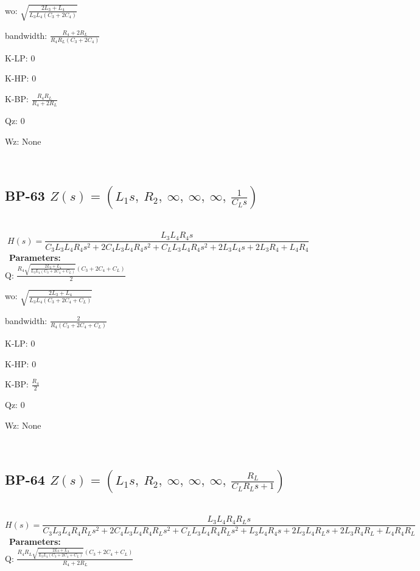\documentclass{article}
\begin{document}
wo: $\sqrt{\frac{2 L_{3} + L_{4}}{L_{3} L_{4} \left(C_{3} + 2 C_{4}\right)}}$\ 

bandwidth: $\frac{R_{4} + 2 R_{L}}{R_{4} R_{L} \left(C_{3} + 2 C_{4}\right)}$\ 

K-LP: $0$\ 

K-HP: $0$\ 

K-BP: $\frac{R_{4} R_{L}}{R_{4} + 2 R_{L}}$\ 

Qz: $0$\ 

Wz: $\text{None}$\ 

\ 

\subsection{BP-63 $Z(s) = \left( L_{1} s, \  R_{2}, \  \infty, \  \infty, \  \infty, \  \frac{1}{C_{L} s}\right)$ } \ 
\textbf{\[H(s) = \frac{L_{3} L_{4} R_{4} s}{C_{3} L_{3} L_{4} R_{4} s^{2} + 2 C_{4} L_{3} L_{4} R_{4} s^{2} + C_{L} L_{3} L_{4} R_{4} s^{2} + 2 L_{3} L_{4} s + 2 L_{3} R_{4} + L_{4} R_{4}}\] } \ 
\textbf{Parameters:}\\ 

Q: $\frac{R_{4} \sqrt{\frac{2 L_{3} + L_{4}}{L_{3} L_{4} \left(C_{3} + 2 C_{4} + C_{L}\right)}} \left(C_{3} + 2 C_{4} + C_{L}\right)}{2}$\ 

wo: $\sqrt{\frac{2 L_{3} + L_{4}}{L_{3} L_{4} \left(C_{3} + 2 C_{4} + C_{L}\right)}}$\ 

bandwidth: $\frac{2}{R_{4} \left(C_{3} + 2 C_{4} + C_{L}\right)}$\ 

K-LP: $0$\ 

K-HP: $0$\ 

K-BP: $\frac{R_{4}}{2}$\ 

Qz: $0$\ 

Wz: $\text{None}$\ 

\ 

\subsection{BP-64 $Z(s) = \left( L_{1} s, \  R_{2}, \  \infty, \  \infty, \  \infty, \  \frac{R_{L}}{C_{L} R_{L} s + 1}\right)$ } \ 
\textbf{\[H(s) = \frac{L_{3} L_{4} R_{4} R_{L} s}{C_{3} L_{3} L_{4} R_{4} R_{L} s^{2} + 2 C_{4} L_{3} L_{4} R_{4} R_{L} s^{2} + C_{L} L_{3} L_{4} R_{4} R_{L} s^{2} + L_{3} L_{4} R_{4} s + 2 L_{3} L_{4} R_{L} s + 2 L_{3} R_{4} R_{L} + L_{4} R_{4} R_{L}}\] } \ 
\textbf{Parameters:}\\ 

Q: $\frac{R_{4} R_{L} \sqrt{\frac{2 L_{3} + L_{4}}{L_{3} L_{4} \left(C_{3} + 2 C_{4} + C_{L}\right)}} \left(C_{3} + 2 C_{4} + C_{L}\right)}{R_{4} + 2 R_{L}}$\ 
\end{document}
